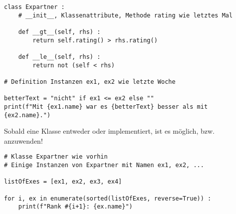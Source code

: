 
\begin{frame}[fragile]
%
\begin{codebox}
\begin{verbatim}
class Expartner :
    # __init__, Klassenattribute, Methode rating wie letztes Mal
    
    def __gt__(self, rhs) :
        return self.rating() > rhs.rating()
    
    def __le__(self, rhs) :
        return not (self < rhs)

# Definition Instanzen ex1, ex2 wie letzte Woche

betterText = "nicht" if ex1 <= ex2 else ""
print(f"Mit {ex1.name} war es {betterText} besser als mit {ex2.name}.")
\end{verbatim}
\end{codebox}
%
\end{frame}


\begin{frame}[fragile]
%
\begin{hintbox}
Sobald eine Klasse entweder  oder  implementiert, ist es möglich,  bzw.  anzuwenden!
\end{hintbox}
%
\begin{codebox}
\begin{verbatim}
# Klasse Expartner wie vorhin
# Einige Instanzen von Expartner mit Namen ex1, ex2, ...

listOfExes = [ex1, ex2, ex3, ex4]

for i, ex in enumerate(sorted(listOfExes, reverse=True)) :
    print(f"Rank #{i+1}: {ex.name}")
\end{verbatim}
\end{codebox}
%
\end{frame}


